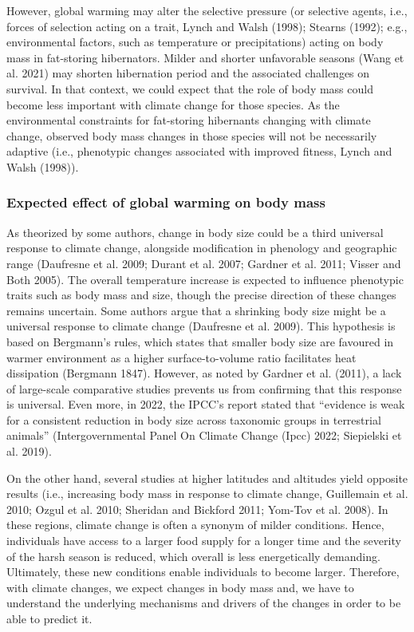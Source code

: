 \documentclass[
  12pt,
  letterpaper,
]{scrartcl}
\begin{document}
However, global warming may alter the selective pressure (or selective
agents, i.e., forces of selection acting on a trait, Lynch and Walsh
(1998); Stearns (1992); e.g., environmental factors, such as temperature
or precipitations) acting on body mass in fat-storing hibernators.
Milder and shorter unfavorable seasons (Wang et al. 2021) may shorten
hibernation period and the associated challenges on survival. In that
context, we could expect that the role of body mass could become less
important with climate change for those species. As the environmental
constraints for fat-storing hibernants changing with climate change,
observed body mass changes in those species will not be necessarily
adaptive (i.e., phenotypic changes associated with improved fitness,
Lynch and Walsh (1998)).

\subsubsection{Expected effect of global warming on body
mass}\label{expected-effect-of-global-warming-on-body-mass}

As theorized by some authors, change in body size could be a third
universal response to climate change, alongside modification in
phenology and geographic range (Daufresne et al. 2009; Durant et al.
2007; Gardner et al. 2011; Visser and Both 2005). The overall
temperature increase is expected to influence phenotypic traits such as
body mass and size, though the precise direction of these changes
remains uncertain. Some authors argue that a shrinking body size might
be a universal response to climate change (Daufresne et al. 2009). This
hypothesis is based on Bergmann's rules, which states that smaller body
size are favoured in warmer environment as a higher surface-to-volume
ratio facilitates heat dissipation (Bergmann 1847). However, as noted by
Gardner et al. (2011), a lack of large-scale comparative studies
prevents us from confirming that this response is universal. Even more,
in 2022, the IPCC's report stated that ``evidence is weak for a
consistent reduction in body size across taxonomic groups in terrestrial
animals'' (Intergovernmental Panel On Climate Change (Ipcc) 2022;
Siepielski et al. 2019).

On the other hand, several studies at higher latitudes and altitudes
yield opposite results (i.e., increasing body mass in response to
climate change, Guillemain et al. 2010; Ozgul et al. 2010; Sheridan and
Bickford 2011; Yom-Tov et al. 2008). In these regions, climate change is
often a synonym of milder conditions. Hence, individuals have access to
a larger food supply for a longer time and the severity of the harsh
season is reduced, which overall is less energetically demanding.
Ultimately, these new conditions enable individuals to become larger.
Therefore, with climate changes, we expect changes in body mass and, we
have to understand the underlying mechanisms and drivers of the changes
in order to be able to predict it.
\end{document}
